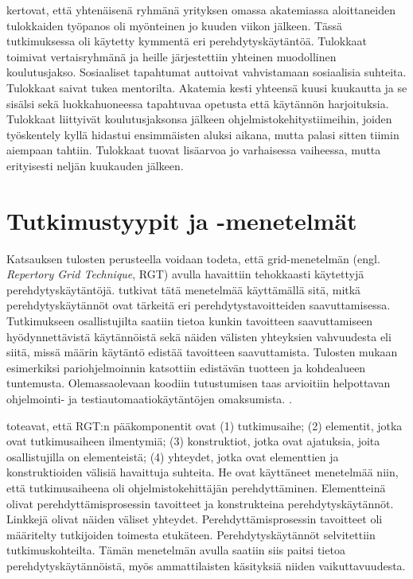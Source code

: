 \documentclass[utf8]{gradu3}
\begin{document}
\textcite{shannon-pool-2016} kertovat, että yhtenäisenä ryhmänä yrityksen omassa akatemiassa aloittaneiden tulokkaiden työpanos oli myönteinen jo kuuden viikon jälkeen. Tässä tutkimuksessa oli käytetty kymmentä eri perehdytyskäytäntöä. Tulokkaat toimivat vertaisryhmänä ja heille järjestettiin yhteinen muodollinen koulutusjakso. Sosiaaliset tapahtumat auttoivat vahvistamaan sosiaalisia suhteita. Tulokkaat saivat tukea mentorilta. Akatemia kesti yhteensä kuusi kuukautta ja se sisälsi sekä luokkahuoneessa tapahtuvaa opetusta että käytännön harjoituksia. Tulokkaat liittyivät koulutusjaksonsa jälkeen ohjelmistokehitystiimeihin, joiden työskentely kyllä hidastui ensimmäisten aluksi aikana, mutta palasi sitten tiimin aiempaan tahtiin. Tulokkaat tuovat lisäarvoa jo varhaisessa vaiheessa, mutta erityisesti neljän kuukauden jälkeen. \parencite{shannon-pool-2016}


\section{Tutkimustyypit ja -menetelmät}

Katsauksen tulosten perusteella voidaan todeta, että grid-menetelmän (engl. \textit{Repertory Grid Technique}, RGT) avulla havaittiin tehokkaasti käytettyjä perehdytyskäytäntöjä. \textcite{buchan-ym-2019} tutkivat tätä menetelmää käyttämällä sitä, mitkä perehdytyskäytännöt ovat tärkeitä eri perehdytystavoitteiden saavuttamisessa. Tutkimukseen osallistujilta saatiin tietoa kunkin tavoitteen saavuttamiseen hyödynnettävistä käytännöistä sekä näiden välisten yhteyksien vahvuudesta eli siitä, missä määrin käytäntö edistää tavoitteen saavuttamista. Tulosten mukaan esimerkiksi pariohjelmoinnin katsottiin edistävän tuotteen ja kohdealueen tuntemusta. Olemassaolevaan koodiin tutustumisen taas arvioitiin helpottavan ohjelmointi- ja testiautomaatiokäytäntöjen omaksumista. \parencite{buchan-ym-2019}.

\textcite{buchan-ym-2019} toteavat, että RGT:n pääkomponentit ovat (1) tutkimusaihe; (2) elementit, jotka ovat tutkimusaiheen ilmentymiä; (3) konstruktiot, jotka ovat ajatuksia, joita osallistujilla on elementeistä; (4) yhteydet, jotka ovat elementtien ja konstruktioiden välisiä havaittuja suhteita. He ovat  käyttäneet menetelmää niin, että tutkimusaiheena oli ohjelmistokehittäjän perehdyttäminen. Elementteinä olivat perehdyttämisprosessin tavoitteet ja konstrukteina perehdytyskäytännöt. Linkkejä olivat näiden väliset yhteydet. Perehdyttämisprosessin tavoitteet oli määritelty tutkijoiden toimesta etukäteen. Perehdytyskäytännöt selvitettiin tutkimuskohteilta. Tämän menetelmän avulla saatiin siis paitsi tietoa perehdytyskäytännöistä, myös ammattilaisten käsityksiä niiden vaikuttavuudesta. 
\end{document}
